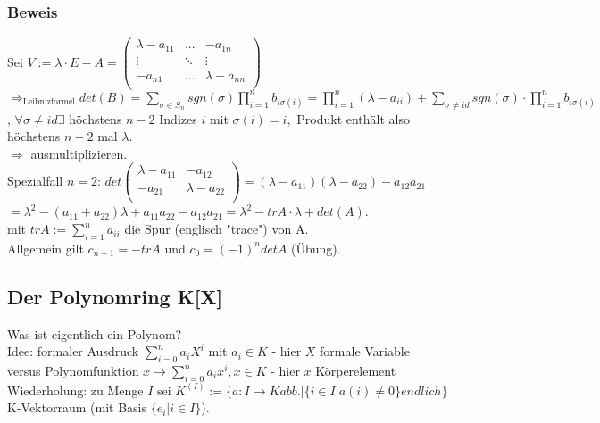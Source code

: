 \documentclass[a4paper, 12pt]{extarticle}
\begin{document}
\subsubsection*{Beweis}
Sei $V:= \lambda \cdot E - A = \left( \begin{matrix}
	\lambda - a_{11} & ... & -a_{1n} \\
	\vdots & \ddots &\vdots \\
	-a_{n1} & ... & \lambda - a_{nn}\\
\end{matrix} \right) $ \\
$\Rightarrow_{\text{Leibnizformel} } det(B) = \sum_{\sigma \in S_n} sgn(\sigma) \prod_{i=1}^{n} b_{i \sigma(i)} = \prod_{i=1}^{n} (\lambda - a_{ii}) + \sum_{\sigma \neq id} sgn(\sigma) \cdot \prod_{i=1}^{n} b_{i \sigma(i)}$, $\forall \sigma \neq id \exists$ höchstens $n-2$ Indizes $i$ mit $\sigma(i) = i,$ Produkt enthält also höchstens $n-2$ mal $\lambda$. \\
$\Rightarrow $ ausmultiplizieren.\\
Spezialfall $n = 2$:
$det\left(\begin{matrix}
	\lambda - a_{11} & -a_{12} \\
	-a_{21} & \lambda - a_{22} \\
\end{matrix}\right) = (\lambda - a_{11})(\lambda - a_{22}) - a_{12}a_{21}$ \\
$=  \lambda^2 - (a_{11} + a_{22}) \lambda + a_{11}a_{22} - a_{12}a_{21} = \lambda^2 - trA\cdot \lambda + det(A)$.\\
mit $trA:= \sum_{i=1}^{n} a_{ii}$ die Spur (englisch "trace") von A.\\
Allgemein gilt $c_{n-1} = -trA$ und $c_0 = (-1)^n detA$ (Übung).\\

\subsection*{Der Polynomring K[X]}
Was ist eigentlich ein Polynom? \\
Idee: formaler Ausdruck $\sum_{i=0}^{n}a_iX^i$ mit $a_i \in K$ - hier $X$ formale Variable \\
versus Polynomfunktion $x \rightarrow \sum_{i=0}^{n} a_i x^i , x\in K$ - hier $x$ Körperelement\\
Wiederholung: zu Menge $I$ sei $K^{(I)} := \{ a: I \rightarrow K abb. | \{i \in I | a(i) \neq 0 \} endlich \}$ K-Vektorraum (mit Basis $\{ e_i | i\in I\}$).\\
\end{document}
